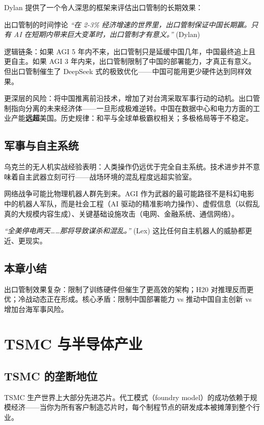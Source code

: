 \documentclass[a4paper]{article}
\begin{document}
Dylan 提供了一个令人深思的框架来评估出口管制的长期效果：

\begin{warningbox}{出口管制的时间悖论}
\textit{``在 2-3\% 经济增速的世界里，出口管制保证中国长期赢。只有 AI 在短期内带来巨大变革时，出口管制才有意义。''} (Dylan)

逻辑链条：如果 AGI 5 年内不来，出口管制只是延缓中国几年，中国最终追上且更自主。如果 AGI 3 年内来，出口管制限制了中国的部署能力，才真正有意义。但出口管制催生了 DeepSeek 式的极致优化——中国可能用更少硬件达到同样效果。

更深层的风险：将中国推离前沿技术，增加了对台湾采取军事行动的动机。出口管制指向分离的未来经济体——一旦形成极难逆转。中国在数据中心和电力方面的工业产能\textbf{远超}美国。历史规律：和平与全球单极霸权相关；多极格局等于不稳定。
\end{warningbox}

\subsection{军事与自主系统}

乌克兰的无人机实战经验表明：人类操作仍远优于完全自主系统。技术进步并不意味着自主武器立刻可行——战场环境的混乱程度远超实验室。

网络战争可能比物理机器人群先到来。AGI 作为武器的最可能路径不是科幻电影中的机器人军队，而是社会工程（AI 驱动的精准影响力操作）、虚假信息（以假乱真的大规模内容生成）、关键基础设施攻击（电网、金融系统、通信网络）。

\textit{``全美停电两天……那将导致谋杀和混乱。''} (Lex) 这比任何自主机器人的威胁都更近、更现实。

\subsection{本章小结}

出口管制效果复杂：限制了训练硬件但催生了更高效的架构；H20 对推理反而更优；冷战动态正在形成。核心矛盾：限制中国部署能力 vs 推动中国自主创新 vs 增加台海军事风险。

\section{TSMC 与半导体产业}

\subsection{TSMC 的垄断地位}

TSMC 生产世界上大部分先进芯片。代工模式（foundry model）的成功依赖于规模经济——当你为所有客户制造芯片时，每个制程节点的研发成本被摊薄到整个行业。
\end{document}
